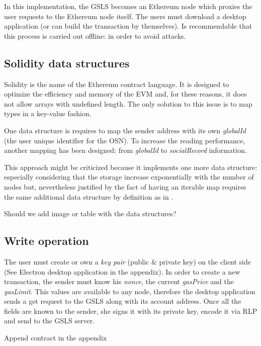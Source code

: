 In this implementation, the GSLS becomes an Ethereum node which proxies the user requests to the Ethereum node itself.
The users must download a desktop application (or can build the transaction by themselves). Is recommendable that this process is carried out offline: in order to avoid attacks.

\subsection{Solidity data structures}
Solidity is the name of the Ethereum contract language. It is designed to optimize the efficiency and memory of the EVM and, for these reasons, it does not allow arrays with undefined length.
The only solution to this issue is to map types in a key-value fashion.

One data structure is requires to map the sender address with its own \textit{globalId} (the user unique identifier for the OSN).  To increase the reading performance, another mapping has been designed: from \textit{globalId} to \textit{socialRecord} information.

This approach might be criticized because it implements one more data structure: especially considering that the storage increase exponentially with the number of nodes but, nevertheless justified by the fact of having an iterable map requires the same additional data structure by definition as in \cite{datastructure_solidity}.

\begin{notation}
  Should we add image or table with the data structures?
\end{notation}


\subsection{Write operation}
The user must create or own a \textit{key pair} (public \& private key) on the client side (See Electron desktop application in the appendix).
In order to create a new transaction, the sender must know his \textit{nonce}, the current \textit{gasPrice} and the \textit{gasLimit}. This values are available to any node, therefore the desktop application sends a get request to the GSLS along with its account address. Once all the fields are known to the sender, she signs it with its private key, encode it via RLP and send to the GSLS server.

\begin{notation}
  Append contract in the appendix
\end{notation}